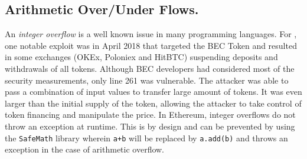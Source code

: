 \subsection{Arithmetic Over/Under Flows.}\label{subsec:ovf}
An \textit{integer overflow} is a well known issue in many programming languages. For \erc, one notable exploit was in April 2018 that targeted the BEC Token\cite{BECToken} and resulted in some exchanges (\eg OKEx, Poloniex and HitBTC) suspending deposits and withdrawals of all tokens. Although BEC developers had considered most of the security measurements, only line 261 was vulnerable\cite{Osiris}\cite{PeckShield}. The attacker was able to pass a combination of input values to transfer large amount of tokens\cite{Overflow}. It was even larger than the initial supply of the token, allowing the attacker to take control of token financing and manipulate the price. In Ethereum, integer overflows do not throw an exception at runtime. This is by design and can be prevented by using the \texttt{SafeMath} library\cite{SafeMath} wherein \texttt{a+b} will be replaced by \texttt{a.add(b)} and throws an exception in the case of arithmetic overflow.

